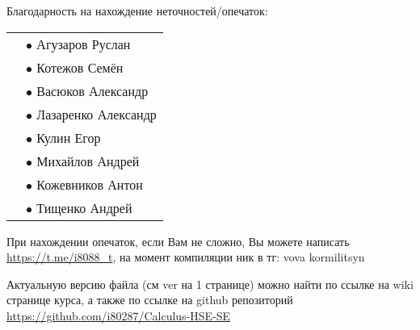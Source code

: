 Благодарность на нахождение неточностей/опечаток:

\begin{tabular}{rl}
    & $\bullet$ Агузаров Руслан \\
    & $\bullet$ Котежов Семён \\
    & $\bullet$ Васюков Александр \\
    & $\bullet$ Лазаренко Александр \\
    & $\bullet$ Кулин Егор \\
    & $\bullet$ Михайлов Андрей \\
    & $\bullet$ Кожевников Антон \\
    & $\bullet$ Тищенко Андрей \\
\end{tabular}

При нахождении опечаток, если Вам не сложно, Вы можете написать \url{https://t.me/i8088_t}, на момент компиляции ник в тг: vova kormilitsyn

Актуальную версию файла (см ver на 1 странице) можно найти по ссылке на wiki странице курса, 
а также по ссылке на github репозиторий \url{https://github.com/i80287/Calculus-HSE-SE}

